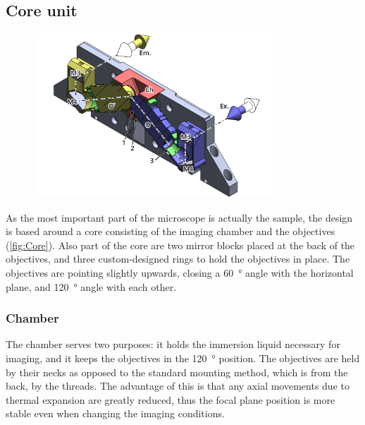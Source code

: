   \subsection{Core unit}
  \label{sec:core}
    \begin{figure}
      \centering
      \includegraphics[width=0.8\textwidth]{SW/frontRender.png}
      \label{fig:Core}
    \end{figure}

    As the most important part of the microscope is actually the sample, the design is based around a core consisting of the imaging chamber and the objectives (\autoref{fig:Core}). Also part of the core are two mirror blocks placed at the back of the objectives, and three custom-designed rings to hold the objectives in place. The objectives are pointing slightly upwards, closing a \SI{60}{\degree} angle with the horizontal plane, and \SI{120}{\degree} angle with each other. 

    \subsubsection{Chamber}
    The chamber serves two purposes: it holds the immersion liquid necessary for imaging, and it keeps the objectives in the \SI{120}{\degree} position. The objectives are held by their necks as opposed to the standard mounting method, which is from the back, by the threads. The advantage of this is that any axial movements due to thermal expansion are greatly reduced, thus the focal plane position is more stable even when changing the imaging conditions.

